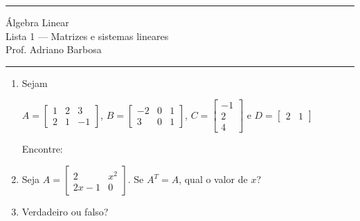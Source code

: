 \documentclass{article}
\begin{document}
\noindent{}\rule{\textwidth}{0.4pt}
\begin{center}
	\'{A}lgebra Linear\\
	Lista 1 --- Matrizes e sistemas lineares \\
	\vspace{0.2cm}
	Prof. Adriano Barbosa
\end{center}
\noindent{}\rule{\textwidth}{0.4pt}

\begin{enumerate}
\item Sejam

$A = \left[
\begin{array}{ccc}
	1 & 2 & 3 \\
	2 & 1 & -1
\end{array}\right]$,
$B = \left[
\begin{array}{ccc}
	-2 & 0 & 1 \\
	3 & 0 & 1
\end{array}\right]$,
$C = \left[
\begin{array}{c}
	-1 \\ 2 \\ 4
\end{array}\right]$ e
$D = \left[
\begin{array}{cc}
	2 & 1
\end{array}\right]$

Encontre:


\item Seja
$A = \left[
\begin{array}{cc}
	2 & x^2 \\
	2x-1 & 0
\end{array}\right]$.
Se $A^T = A$, qual o valor de $x$?

\item Verdadeiro ou falso?


\end{enumerate}
\end{document}
